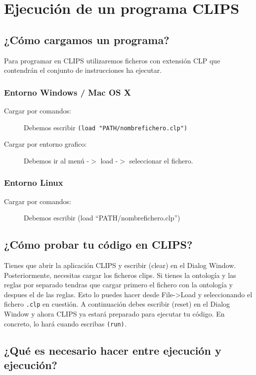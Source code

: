 \documentclass[11pt,svgnames]{scrbook}
\begin{document}
\section{Ejecución de un programa CLIPS}

\subsection{¿Cómo cargamos un programa?}

Para programar en CLIPS utilizaremos ficheros con extensión CLP que contendrán
el conjunto de instrucciones ha ejecutar.
\subsubsection*{Entorno Windows / Mac OS X}
\begin{description}
 \item[Cargar por comandos:] Debemos escribir   \texttt{(load
"PATH/nombrefichero.clp")}
\item [Cargar por entorno grafico:] Debemos ir al menú -$>$ load -$>$
seleccionar el
fichero.
 \end{description}


\subsubsection*{Entorno Linux}
\begin{description}
 \item[Cargar por comandos:] Debemos escribir  (load ``PATH/nombrefichero.clp'')
 \end{description}


\subsection{¿Cómo probar tu código en CLIPS?}

Tienes que abrir
la aplicación CLIPS y escribir (clear) en el Dialog Window. Posteriormente,
necesitas cargar los ficheros clips. Si tienes la ontología y las reglas por
separado tendras que cargar primero el fichero con la ontología y despues el de
las reglas. Esto lo puedes hacer desde File->Load y seleccionando el fichero
\texttt{.clp} en cuestión. A continuación debes escribir (reset) en el Dialog
Window y ahora CLIPS ya estará preparado para ejecutar tu código. En concreto,
lo hará cuando escribas \texttt{(run)}.




\subsection{¿Qué es necesario hacer entre ejecución y ejecución?}
\end{document}
